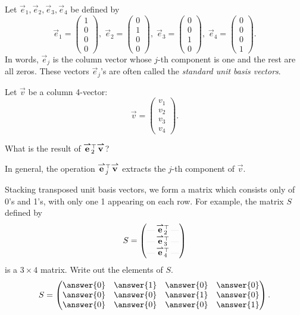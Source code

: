 \documentclass{ximera}
\author{Tae Eun Kim}
\newcommand{\rvx}[1]{\rule[0.5ex]{1em}{.05pt}\,#1\,\rule[0.5ex]{1em}{.05pt}}
\begin{document}
\begin{exercise}
  Let $\vec{e}_1, \vec{e}_2, \vec{e}_3, \vec{e}_4$ be defined by
  \[
    \vec{e}_1 =
    \begin{pmatrix}
      1\\ 0\\ 0\\ 0
    \end{pmatrix},\;
    \vec{e}_2 =
    \begin{pmatrix}
      0\\ 1\\ 0\\ 0
    \end{pmatrix},\;
    \vec{e}_3 =
    \begin{pmatrix}
      0\\ 0\\ 1\\ 0
    \end{pmatrix},\;
    \vec{e}_4 =
    \begin{pmatrix}
      0\\ 0\\ 0\\ 1
    \end{pmatrix}.
  \]
  In words, $\vec{e}_j$ is the column vector whose $j$-th component is
  one and the rest are all zeros. These vectors $\vec{e}_j$'s are often
  called the \textit{standard unit basis vectors}.

  Let $\vec{v}$ be a column 4-vector:
  \[
    \vec{v} =
    \begin{pmatrix}
      v_1 \\ v_2 \\ v_3 \\ v_4
    \end{pmatrix}.
  \]

  What is the result of ${\overset{\boldsymbol{\rightharpoonup}}{\mathbf{e}}}\hspace{0in}_2^\top {\overset{\boldsymbol{\rightharpoonup}}{\mathbf{v}}}\hspace{0in}$?
  \begin{multipleChoice}
  \end{multipleChoice}
  \begin{feedback}[correct]
    In general, the operation ${\overset{\boldsymbol{\rightharpoonup}}{\mathbf{e}}}\hspace{0in}_j^\top {\overset{\boldsymbol{\rightharpoonup}}{\mathbf{v}}}\hspace{0in}$ extracts
    the $j$-th component of $\vec{v}$.
  \end{feedback}

  Stacking transposed unit basis vectors, we form a matrix which
  consists only of 0's and 1's, with only one 1 appearing on each row. For
  example, the matrix $S$ defined by
  \[
    S =
    \begin{pmatrix}
      \rvx{\vec{e}_2^\transpose}\\
      \rvx{\vec{e}_3^\transpose}\\
      \rvx{\vec{e}_4^\transpose}
    \end{pmatrix}
  \]
  is a $3 \times 4$ matrix. Write out the elements of $S$.
  \[
    S =
    \begin{pmatrix}
      \answer{0} & \answer{1} & \answer{0} & \answer{0} \\
      \answer{0} & \answer{0} & \answer{1} & \answer{0} \\
      \answer{0} & \answer{0} & \answer{0} & \answer{1}
    \end{pmatrix}.
  \]


\end{exercise}
\end{document}
